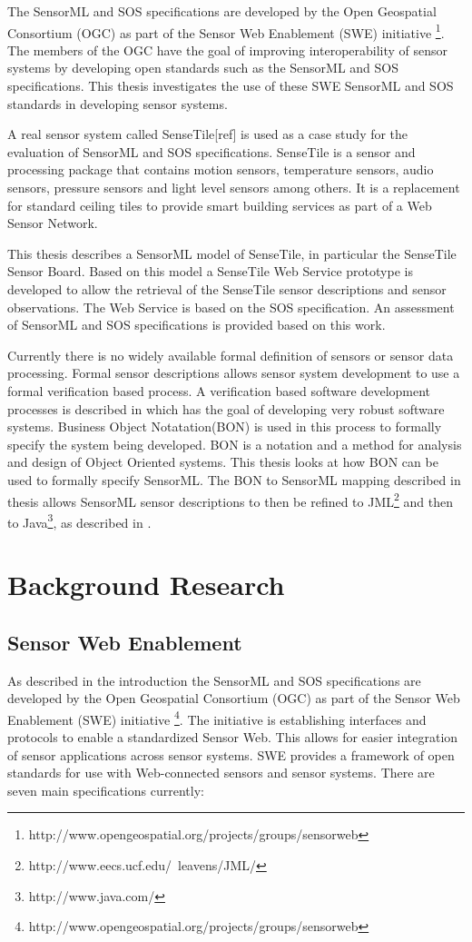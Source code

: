 \documentclass[]{final_report}
\begin{document}
The SensorML and SOS specifications are developed by the Open Geospatial Consortium (OGC) as part of the Sensor Web Enablement (SWE) initiative \footnote{http://www.opengeospatial.org/projects/groups/sensorweb}. The members of the OGC have the goal of improving interoperability of sensor systems by developing open standards such as the SensorML and SOS specifications. This thesis investigates the use of these SWE SensorML and SOS standards in developing sensor systems.

A real sensor system called SenseTile[ref] is used as a case study for the evaluation of SensorML and SOS specifications. SenseTile is a sensor and processing package that contains motion sensors, temperature sensors, audio sensors, pressure sensors and light level sensors among others. It is a replacement for standard ceiling tiles to provide smart building services as part of a Web Sensor Network.

This thesis describes a  SensorML model of SenseTile, in particular the SenseTile Sensor Board. Based on this model a SenseTile Web Service prototype is developed to allow the retrieval of the SenseTile sensor descriptions and sensor observations. The Web Service is based on the SOS specification. An assessment of SensorML and SOS specifications is provided based on this work.

Currently there is no widely available formal definition of sensors or sensor data processing. Formal sensor descriptions allows sensor system development to use a formal verification based process. A verification based software development processes is described in \cite{Kiniryref} which has the goal of developing very robust software systems. Business Object Notatation(BON)\cite{BONref} is used in this process to formally specify the system being developed. BON is a notation and a method for analysis and design of Object Oriented systems. This thesis looks at how BON can be used to formally specify SensorML. The BON to SensorML mapping described in thesis allows SensorML sensor descriptions to then be refined to JML\footnote{http://www.eecs.ucf.edu/~leavens/JML/} and then to Java\footnote{http://www.java.com/}, as described in \cite{Kiniryref}.


\chapter{ Background Research}

\section{Sensor Web Enablement}\label{SWESec}
As described in the introduction the SensorML and SOS specifications are developed by the Open Geospatial Consortium (OGC) as part of the Sensor Web Enablement (SWE) initiative \footnote{http://www.opengeospatial.org/projects/groups/sensorweb}. The initiative is establishing interfaces and protocols to enable a standardized Sensor Web. This allows for easier integration of sensor applications across sensor systems. SWE provides a framework of open standards for use with Web-connected sensors and sensor systems. There are seven main specifications currently:
\end{document}
